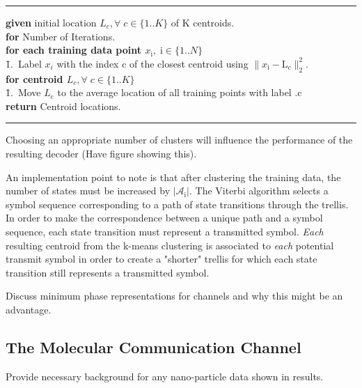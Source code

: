 \documentclass[12pt,a4paper]{article}
\begin{document}
    \noindent\rule[10pt]{\textwidth}{0.4pt}
    {\footnotesize
    \begin{tabbing}
    {\bf given} initial location $L_c, \forall \;c  \in \{1..K\}$ of K centroids.\\
        {\textbf{for} Number of Iterations}.\\
         \qquad \= {\bf for each training data point $x_{\mathrm{i}}, \;\mathrm{i}  \in \{1..N\}$}\\
        \qquad \qquad \= 1.\ Label $x_i$ with the index c of the closest centroid using $\|x_{\mathrm{i}}- \text{L}_c\|^2_2$. \\
        \qquad \= {\bf for centroid $L_c, \forall \;c  \in \{1..K\}$}\\
                \qquad \qquad \= 1.\ Move $L_{\mathrm{c}}$ to the average location of all training points with label .c\\


        {\bf return} Centroid locations.
    \end{tabbing}}
    \noindent\rule[10pt]{\textwidth}{0.4pt}
    
Choosing an appropriate number of clusters will influence the performance of the resulting decoder (Have figure showing this).
\par An implementation point to note is that after clustering the training data, the number of states must be increased by $|\mathcal{A}_{\mathrm{i}}|$. The Viterbi algorithm selects a symbol sequence corresponding to a path of state transitions through the trellis. In order to make the correspondence between a unique path and a symbol sequence, each state transition must represent a transmitted symbol. \emph{Each} resulting centroid from the k-means clustering is associated to \emph{each} potential transmit symbol in order to create a "shorter" trellis for which each state transition still represents a transmitted symbol. 

Discuss minimum phase representations for channels and why this might be an advantage. 

\subsection{The Molecular Communication Channel}
Provide necessary background for any nano-particle data shown in results. 
\end{document}
